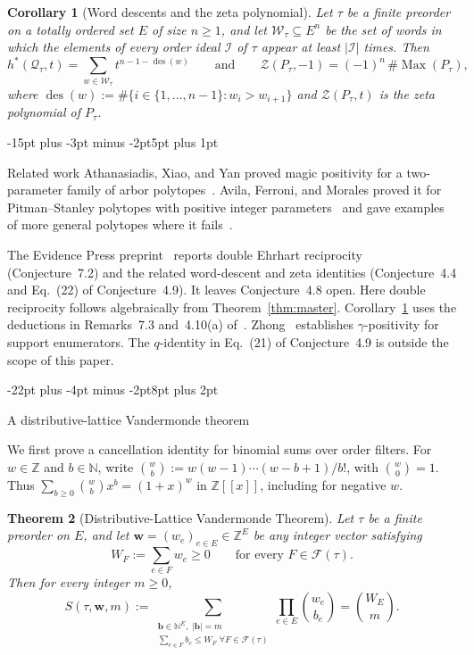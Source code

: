 \documentclass[11pt,letterpaper]{article}
\makeatletter
\renewcommand{\section}{\@startsection{section}{1}{\z@}%
  {-22pt plus -4pt minus -2pt}{8pt plus 2pt}%
  {\normalfont\fontsize{14}{17}\selectfont\bfseries\raggedright}}
\renewcommand{\subsection}{\@startsection{subsection}{2}{\z@}%
  {-15pt plus -3pt minus -2pt}{5pt plus 1pt}%
  {\normalfont\bfseries\raggedright}}
\theoremstyle{result}
\newtheorem{theorem}{Theorem}[section]
\newtheorem{corollary}[theorem]{Corollary}
\theoremstyle{definition}
\theoremstyle{remark}
\newcommand{\NN}{\mathbb{N}}
\newcommand{\ZZ}{\mathbb{Z}}
\newcommand{\qQ}{\mathcal{Q}}
\newcommand{\fF}{\mathcal{F}}
\newcommand{\iI}{\mathcal{I}}
\newcommand{\wW}{\mathcal{W}}
\newcommand{\zZ}{\mathcal{Z}}
\newcommand{\des}{\operatorname{des}}
\newcommand{\Max}{\operatorname{Max}}
\makeatother
\begin{document}
\begin{corollary}[Word descents and the zeta polynomial]\label{cor:hstar-zeta}
Let $\tau$ be a finite preorder on a totally ordered set $E$ of size $n\ge 1$, and let $\wW_\tau\subseteq E^n$ be the set of words in which the elements of every order ideal $\iI$ of $\tau$ appear at least $|\iI|$ times. Then
\[
h^*(\qQ_\tau, t) = \sum_{w\in\wW_\tau} t^{n-1-\des(w)}
\qquad\text{and}\qquad
\zZ(P_\tau, -1) = (-1)^n\,\#\Max(P_\tau),
\]
where $\des(w):=\#\{i\in\{1,\dots,n-1\}: w_i > w_{i+1}\}$ and $\zZ(P_\tau, t)$ is the zeta polynomial of $P_\tau$.
\end{corollary}

\subsection{Related work}
Athanasiadis, Xiao, and Yan proved magic positivity for a two-parameter family of arbor polytopes~\cite[Theorem~1.4]{AXY26}. Avila, Ferroni, and Morales proved it for Pitman--Stanley polytopes with positive integer parameters~\cite[Theorem~1.1]{AFM26} and gave examples of more general polytopes where it fails~\cite[Example~5.5 and Section~5.5]{AFM26}.

The Evidence Press preprint~\cite[Theorem~7.1 and Corollaries~7.3--7.4]{EP26} reports double Ehrhart reciprocity (Conjecture~7.2) and the related word-descent and zeta identities (Conjecture~4.4 and Eq.~(22) of Conjecture~4.9). It leaves Conjecture~4.8 open. Here double reciprocity follows algebraically from Theorem~\ref{thm:master}. Corollary~\ref{cor:hstar-zeta} uses the deductions in Remarks~7.3 and~4.10(a) of~\cite{AC26}. Zhong~\cite{Zho26} establishes $\gamma$-positivity for support enumerators. The $q$-identity in Eq.~(21) of Conjecture~4.9 is outside the scope of this paper.

\section{A distributive-lattice Vandermonde theorem}
\label{sec:dlv}

We first prove a cancellation identity for binomial sums over order filters. For $w\in\ZZ$ and $b\in\NN$, write $\binom{w}{b}:=w(w-1)\cdots(w-b+1)/b!$, with $\binom{w}{0}=1$. Thus $\sum_{b\ge 0}\binom{w}{b}x^b=(1+x)^w$ in $\ZZ[[x]]$, including for negative $w$.

\begin{samepage}
\begin{theorem}[Distributive-Lattice Vandermonde Theorem]\label{thm:dlv}
Let $\tau$ be a finite preorder on $E$, and let $\mathbf{w}=(w_e)_{e\in E}\in\ZZ^E$ be any integer vector satisfying
\[
W_F := \sum_{e\in F} w_e \ge 0 \qquad \text{for every } F\in\fF(\tau).
\]
Then for every integer $m\ge 0$,
\begin{equation}\label{eq:dlv}
S(\tau,\mathbf{w},m) := \sum_{\substack{\mathbf{b}\in\NN^E,\; |\mathbf{b}|=m \\ \sum_{e\in F} b_e \le W_F \;\forall F\in\fF(\tau)}} \prod_{e\in E}\binom{w_e}{b_e} = \binom{W_E}{m}.
\end{equation}
\end{theorem}
\end{samepage}
\end{document}
